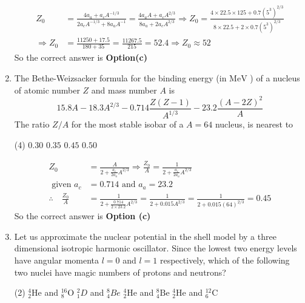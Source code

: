 \begin{enumerate}
\begin{answer}
\begin{align*}
		Z_0&=\frac{4 a_a+a_c A^{-1 / 3}}{2 a_c A^{-1 / 3}+8 a_a A^{-1}}=\frac{4 a_a A+a_c A^{2 / 3}}{8 a_a+2 a_c A^{2 / 3}} \Rightarrow Z_0=\frac{4 \times 22.5 \times 125+0.7\left(5^3\right)^{2 / 3}}{8 \times 22.5+2 \times 0.7\left(5^3\right)^{2 / 3}} \\
		\Rightarrow Z_0&=\frac{11250+17.5}{180+35}=\frac{11267.5}{215}=52.4 \Rightarrow Z_0 \approx 52
		\end{align*}
		So the correct answer is \textbf{Option(c)}
	\end{answer}
	\item  The Bethe-Weizsacker formula for the binding energy (in $\mathrm{MeV}$ ) of a nucleus of atomic number $Z$ and mass number $A$ is
	$$
	15.8 A-18.3 A^{2 / 3}-0.714 \frac{Z(Z-1)}{A^{1 / 3}}-23.2 \frac{(A-2 Z)^2}{A}
	$$
	The ratio $Z / A$ for the most stable isobar of a $A=64$ nucleus, is nearest to
	\begin{tasks}(4)
		\task[\textbf{a.}]$0.30$
		\task[\textbf{b.}] $0.35$
		\task[\textbf{c.}]$0.45$
		\task[\textbf{d.}]$0.50$ 
	\end{tasks}
	\begin{answer}
		\begin{align*}
		Z_0&=\frac{A}{2+\frac{a_c}{2 a_a} A^{2 / 3}} \Rightarrow \frac{Z_0}{A}=\frac{1}{2+\frac{a_c}{2 a_a} A^{2 / 3}}\\
		\text{ given }a_c&=0.714\text{ and }a_a=23.2\\
		\therefore \quad\frac{Z_0}{A}&=\frac{1}{2+\frac{0.714}{2 \times 23.2} A^{2 / 3}}=\frac{1}{2+0.015 A^{2 / 3}}=\frac{1}{2+0.015(64)^{2 / 3}}=0.45
		\end{align*}
		So the correct answer is \textbf{Option (c)}
	\end{answer}
	\item  Let us approximate the nuclear potential in the shell model by a three dimensional isotropic harmonic oscillator. Since the lowest two energy levels have angular momenta $l=0$ and $l=1$ respectively, which of the following two nuclei have magic numbers of protons and neutrons?
	{}
	\begin{tasks}(2)
		\task[\textbf{a.}]${ }_2^4 \mathrm{He}$ and ${ }_8^{16} \mathrm{O}$
		\task[\textbf{b.}]${ }_1^2 D$ and ${ }_4^8 B e$
		\task[\textbf{c.}]${ }_2^4 \mathrm{He}$ and ${ }_4^8 \mathrm{Be}$
		\task[\textbf{d.}] ${ }_2^4 \mathrm{He}$ and ${ }_6^{12} \mathrm{C}$
	\end{tasks}
	\begin{answer}
		\begin{align*}

\end{align*}
\end{answer}
\end{enumerate}
